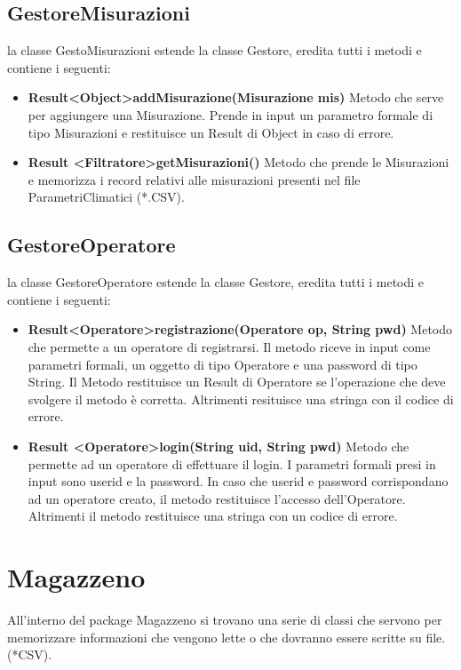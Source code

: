 \documentclass[a4paper, 12pt]{report}
\begin{document}
			\subsection{GestoreMisurazioni}
			la classe GestoMisurazioni estende la classe Gestore, eredita tutti i metodi e contiene i seguenti:
			\begin{itemize}
				\item \textbf{Result\textless Object\textgreater addMisurazione(Misurazione mis)}
				Metodo che serve per aggiungere una Misurazione. Prende in input un parametro formale di tipo Misurazioni e restituisce un Result di Object in caso di errore.

				\item \textbf {Result \textless Filtratore\textgreater getMisurazioni()}
				Metodo che prende le Misurazioni e memorizza i record relativi alle misurazioni presenti nel file ParametriClimatici (*.CSV).
			\end{itemize}

			\subsection{GestoreOperatore}
			la classe GestoreOperatore estende la classe Gestore, eredita tutti i metodi e contiene i seguenti:
			\begin{itemize}
				\item \textbf{Result\textless Operatore\textgreater registrazione(Operatore op, String pwd)}
				Metodo che permette a un operatore di registrarsi. Il metodo riceve in input come parametri formali, un oggetto di tipo Operatore e una password di tipo String. Il Metodo restituisce un Result di Operatore se l'operazione che deve svolgere il metodo è corretta. Altrimenti resituisce una stringa con il codice di errore.
				\item \textbf{Result \textless Operatore\textgreater login(String uid, String pwd)}
				Metodo che permette ad un operatore di effettuare il login. I parametri formali presi in input sono userid e la password. In caso che userid e password corrispondano ad un operatore creato, il metodo restituisce l'accesso dell'Operatore. Altrimenti il metodo restituisce una stringa con un codice di errore.
			\end{itemize}





		\section{Magazzeno}
		All'interno del package Magazzeno si trovano una serie di classi che servono per memorizzare informazioni che vengono lette o che dovranno essere scritte su file.(*CSV).
\end{document}
